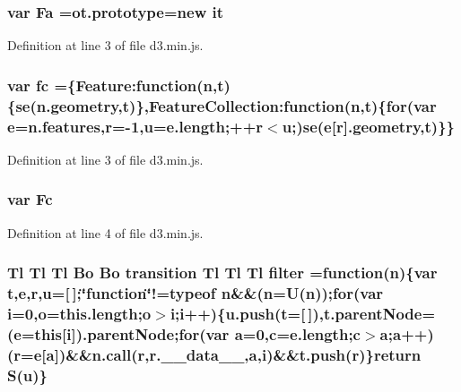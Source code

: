 \subsubsection[{Fa}]{\setlength{\rightskip}{0pt plus 5cm}var Fa ={\bf ot.\+prototype}=new it}\label{d3_8min_8js_ab7f82dd07da39628c8725df4ba83ec3b}


Definition at line 3 of file d3.\+min.\+js.

\subsubsection[{fc}]{\setlength{\rightskip}{0pt plus 5cm}var fc =\{Feature\+:function({\bf n},t)\{se(n.\+geometry,t)\},Feature\+Collection\+:function({\bf n},t)\{{\bf for}(var {\bf e}=n.\+features,{\bf r}=-\/1,u=e.\+length;++{\bf r}$<$u;)se({\bf e}[{\bf r}].geometry,t)\}\}}\label{d3_8min_8js_a9258689c10b981224f20e27478d1cc35}


Definition at line 3 of file d3.\+min.\+js.

\subsubsection[{Fc}]{\setlength{\rightskip}{0pt plus 5cm}var Fc}\label{d3_8min_8js_ae5f31cd1cbbfda0b438aae8261a34bfe}


Definition at line 4 of file d3.\+min.\+js.

\subsubsection[{filter}]{ {\bf Tl} {\bf Tl} {\bf Tl} {\bf Bo} {\bf Bo} {\bf transition} {\bf Tl} {\bf Tl} {\bf Tl} filter =function({\bf n})\{var t,{\bf e},{\bf r},u=[$\,$];\char`\"{}function\char`\"{}!=typeof {\bf n}\&\&({\bf n}=U({\bf n}));{\bf for}(var {\bf i}=0,{\bf o}=this.\+length;{\bf o}$>${\bf i};{\bf i}++)\{u.\+push(t=[$\,$]),t.\+parent\+Node=({\bf e}={\bf this}[{\bf i}]).parent\+Node;{\bf for}(var {\bf a}=0,{\bf c}=e.\+length;{\bf c}$>${\bf a};{\bf a}++)({\bf r}={\bf e}[{\bf a}])\&\&{\bf n.\+call}({\bf r},r.\+\_\+\+\_\+data\+\_\+\+\_\+,{\bf a},{\bf i})\&\&t.\+push({\bf r})\}{\bf return} S(u)\}}\label{d3_8min_8js_a893c28ca1f9411ea302b17f7f5b18253}


